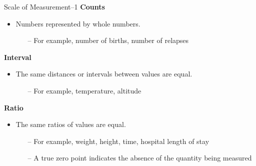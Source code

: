 \documentclass[10pt,dvipsnames, aspectratio=169]{beamer}
\begin{document}
\begin{frame}[t]{Scale of Measurement--1}
	\textbf{Counts}
	\begin{itemize}
		\item Numbers represented by whole numbers. 
		\begin{itemize}
			\item [--]For example, number of births, number of relapses
		\end{itemize}
	\end{itemize}
	
	\textbf{Interval}
	\begin{itemize}
		\item The same distances or intervals between values are equal.
		\begin{itemize}
			\item [--]For example, temperature, altitude
		\end{itemize}
	\end{itemize}
	
	\textbf{Ratio}
	\begin{itemize}
		\item The same ratios of values are equal.
		\begin{itemize}
			\item [--]For example, weight, height, time, hospital length of
			stay
			\item [--]A true zero point indicates the absence of the quantity
			being measured
		\end{itemize}
	\end{itemize}
	
\end{frame}
\end{document}
